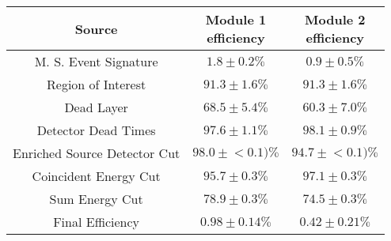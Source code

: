\begin{tabular}{|c|c|c|}
\hline
  Source & \makecell{Module 1\\efficiency} & \makecell{Module 2\\efficiency} \\
\hline
  M. S. Event Signature & $1.8 \pm 0.2\%$ & $0.9 \pm 0.5\%$ \\
  Region of Interest & $91.3 \pm 1.6\%$ & $91.3 \pm 1.6\%$ \\
  Dead Layer & $68.5 \pm 5.4\%$ & $60.3 \pm 7.0\%$ \\
  Detector Dead Times & $97.6 \pm 1.1\%$ & $98.1 \pm 0.9\%$ \\
  Enriched Source Detector Cut & $98.0 \pm{}<\!0.1)\%$ & $94.7 \pm{}<\!0.1)\%$ \\
  Coincident Energy Cut & $95.7 \pm 0.3\%$ & $97.1 \pm 0.3\%$ \\
  Sum Energy Cut & $78.9 \pm 0.3\%$ & $74.5 \pm 0.3\%$ \\
  \hline Final Efficiency & $0.98 \pm 0.14\%$ & $0.42 \pm 0.21\%$ \\
\hline
\end{tabular}
